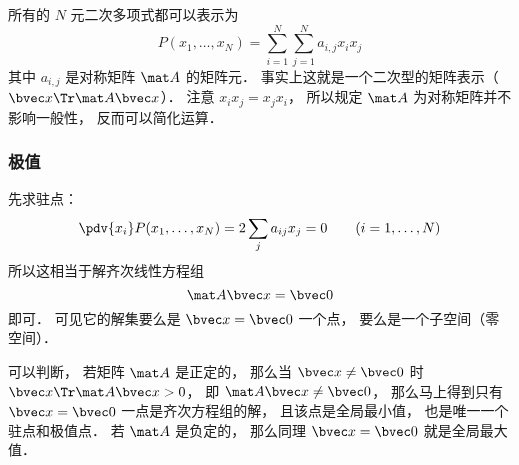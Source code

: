 

所有的 $N$ 元二次多项式都可以表示为
\begin{equation}
P(x_1,\dots,x_N) = \sum_{i=1}^N\sum_{j=1}^N a_{i,j}x_i x_j
\end{equation}
其中 $a_{i,j}$ 是对称矩阵 $\mat A$ 的矩阵元． 事实上这就是一个二次型的矩阵表示（$\bvec x\Tr \mat A \bvec x$）． 注意 $x_i x_j = x_j x_i$， 所以规定 $\mat A$ 为对称矩阵并不影响一般性， 反而可以简化运算．

\subsubsection{极值}
先求驻点：
\begin{equation}
\pdv{x_i}P(x_1,\dots,x_N) = 2\sum_j a_{ij} x_j = 0 \qquad (i = 1,\dots,N)
\end{equation}
所以这相当于解齐次线性方程组
\begin{equation}
\mat A \bvec x = \bvec 0
\end{equation}
即可． 可见它的解集要么是 $\bvec x = \bvec 0$ 一个点， 要么是一个子空间（零空间）．

可以判断， 若矩阵 $\mat A$ 是正定的， 那么当 $\bvec x \ne \bvec 0$ 时 $\bvec x\Tr \mat A \bvec x > 0$， 即 $\mat A \bvec x \ne \bvec 0$， 那么马上得到只有 $\bvec x = \bvec 0$ 一点是齐次方程组的解， 且该点是全局最小值， 也是唯一一个驻点和极值点． 若 $\mat A$ 是负定的， 那么同理 $\bvec x = \bvec 0$ 就是全局最大值．
